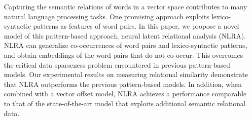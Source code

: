Capturing the semantic relations of words in a vector space contributes to many natural language processing tasks. One promising approach exploits lexico-syntactic patterns as features of word pairs. In this paper, we propose a novel model of this pattern-based approach, neural latent relational analysis (NLRA). NLRA can generalize co-occurrences of word pairs and lexico-syntactic patterns, and obtain embeddings of the word pairs that do not co-occur. This overcomes the critical data sparseness problem encountered in previous pattern-based models. Our experimental results on measuring relational similarity demonstrate that NLRA outperforms the previous pattern-based models. In addition, when combined with a vector offset model, NLRA achieves a performance comparable to that of the state-of-the-art model that exploits additional semantic relational data.
